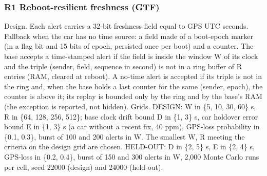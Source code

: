 \subsubsection*{R1 Reboot-resilient freshness (GTF)}
Design. Each alert carries a 32-bit freshness field equal to GPS UTC seconds. Fallback when the car has no time source: a field made of a boot-epoch marker (in a flag bit and 15 bits of epoch, persisted once per boot) and a counter. The base accepts a time-stamped alert if the field is inside the window W of its clock and the triple (sender, field, sequence in second) is not in a ring buffer of R entries (RAM, cleared at reboot). A no-time alert is accepted if its triple is not in the ring and, when the base holds a last counter for the same (sender, epoch), the counter is above it; its replay is bounded only by the ring and by the base's RAM (the exception is reported, not hidden).
Grids. DESIGN: W in \{5, 10, 30, 60\} s, R in \{64, 128, 256, 512\}; base clock drift bound D in \{1, 3\} s, car holdover error bound E in \{1, 3\} s (a car without a recent fix, 40 ppm), GPS-loss probability in \{0.1, 0.3\}, burst of 100 and 200 alerts in W. The smallest W, R meeting the criteria on the design grid are chosen. HELD-OUT: D in \{2, 5\} s, E in \{2, 4\} s, GPS-loss in \{0.2, 0.4\}, burst of 150 and 300 alerts in W, 2,000 Monte Carlo runs per cell, seed 22000 (design) and 24000 (held-out).
